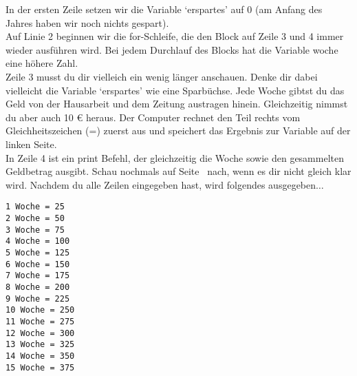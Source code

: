 In der ersten Zeile setzen wir die Variable `erspartes' auf 0 (am Anfang des Jahres haben wir noch nichts gespart).\\
Auf Linie 2 beginnen wir die for-Schleife, die den Block auf Zeile 3 und 4 immer wieder ausführen wird. Bei jedem Durchlauf des Blocks hat die Variable woche eine höhere Zahl.\\
Zeile 3 musst du dir vielleich ein wenig länger anschauen. Denke dir dabei vielleicht die Variable `erspartes' wie eine Sparbüchse. Jede Woche gibtst du das Geld von der Hausarbeit und dem Zeitung austragen hinein. Gleichzeitig nimmst du aber auch 10 € heraus. Der Computer rechnet den Teil rechts vom Gleichheitszeichen (=) zuerst aus und speichert das Ergebnis zur Variable auf der linken Seite.\\
In Zeile 4 ist ein print Befehl, der gleichzeitig die Woche sowie den gesammelten Geldbetrag ausgibt. Schau nochmals auf Seite~\pageref{trickswithstrings} nach, wenn es dir nicht gleich klar wird. Nachdem du alle Zeilen eingegeben hast, wird folgendes ausgegeben$\ldots$

\begin{Verbatim}[frame=single]
1 Woche = 25
2 Woche = 50
3 Woche = 75
4 Woche = 100
5 Woche = 125
6 Woche = 150
7 Woche = 175
8 Woche = 200
9 Woche = 225
10 Woche = 250
11 Woche = 275
12 Woche = 300
13 Woche = 325
14 Woche = 350
15 Woche = 375
\end{Verbatim}

